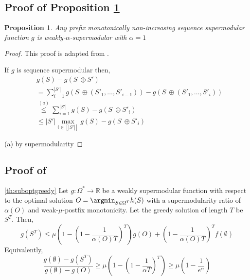 \documentclass{article} %
\newtheorem{proposition}[theorem]{Proposition}
\begin{document}
\subsection{Proof of Proposition \ref{th:alpha=1}} \label{sec:proofalpha=1}

\begin{proposition} \label{th:alpha=1}
    Any prefix monotonically non-increasing sequence supermodular function $g$ is weakly-$\alpha$-supermodular with $\alpha = 1$
\end{proposition}

\begin{proof}

This proof is adapted from \citet{liberty2017greedy}.

If $g$ is sequence supermodular then,
\begin{align*}
    &g(S) - g(S \ \oplus S' ) \\
    &= \sum_{i = 1}^{|S'|} g(S \ \oplus \left(S'_1, \dots, S'_{i - 1}\right)) - g(S \ \oplus \left(S'_1, \dots, S'_{i}\right)) \\
    &\overset{(a)}{\leq} \sum_{i = 1}^{|S'|} g(S) - g(S \ \oplus  S'_{i}) \\
    &\leq |S'|\max_{i \in [|S'|]} g(S) - g(S \ \oplus  S'_{i})
\end{align*}

(a) by supermodularity


\end{proof}

\subsection{Proof of } \label{sec:proofsuboptgreedy}



\begin{customtheorem}{\ref{th:suboptgreedy}}
    Let $g: \Omega^* \to \mathbb{R}$ be a weakly supermodular function with respect to the optimal solution $O = \argmin_{S \in \Omega^T} h(S)$ with a supermodularity ratio of $\alpha(O)$ and weak-$\mu$-postfix monotonicity. Let the greedy solution of length $T$ be $S^T$. Then,
    \begin{equation*}
        g(S^T) \leq  \mu\left(1 - \left(1 - \frac{1}{\alpha(O) T}\right)^T\right)
        g(O) +  \left(1 - \frac{1}{\alpha(O) T}\right)^Tf(\emptyset)
    \end{equation*}
    Equivalently, 
    \begin{equation*}
        \frac{g(\emptyset) - g(S^T)}{g(\emptyset) - g(O)} \geq \mu\left(1 - \left(1 - \frac{1}{\alpha T}\right)^T\right) \geq \mu\left(1 - \frac{1}{e^{\alpha}}\right)
    \end{equation*}
\end{customtheorem}
\end{document}
